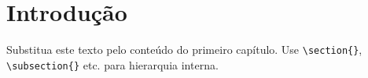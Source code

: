 \chapter{Introdução}

Substitua este texto pelo conteúdo do primeiro capítulo. Use
\verb|\section{}|, \verb|\subsection{}| etc. para hierarquia interna.
